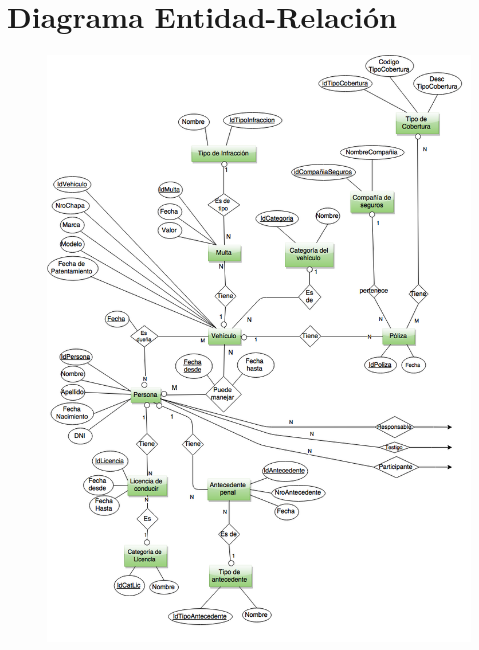 \section{Diagrama Entidad-Relación}

\begin{figure}[h!]
  \centering
  \includegraphics[width=1\textwidth]{./images/DER_1.png}
\end{figure}

